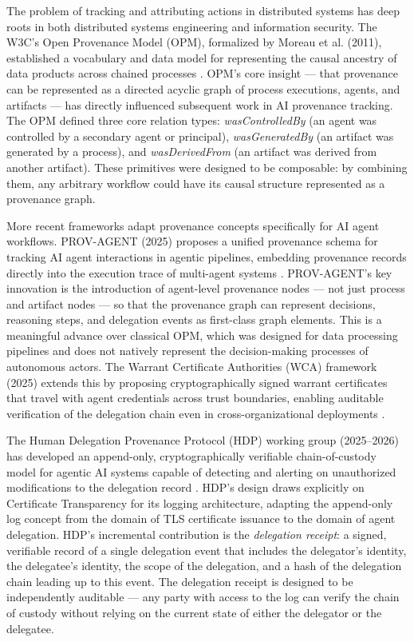 The problem of tracking and attributing actions in distributed systems has deep roots in both distributed systems engineering and information security. The W3C's Open Provenance Model (OPM), formalized by Moreau et al. (2011), established a vocabulary and data model for representing the causal ancestry of data products across chained processes \cite{moreau2015-prov}. OPM's core insight — that provenance can be represented as a directed acyclic graph of process executions, agents, and artifacts — has directly influenced subsequent work in AI provenance tracking. The OPM defined three core relation types: \textit{wasControlledBy} (an agent was controlled by a secondary agent or principal), \textit{wasGeneratedBy} (an artifact was generated by a process), and \textit{wasDerivedFrom} (an artifact was derived from another artifact). These primitives were designed to be composable: by combining them, any arbitrary workflow could have its causal structure represented as a provenance graph.

More recent frameworks adapt provenance concepts specifically for AI agent workflows. PROV-AGENT (2025) proposes a unified provenance schema for tracking AI agent interactions in agentic pipelines, embedding provenance records directly into the execution trace of multi-agent systems \cite{prov-agent2025}. PROV-AGENT's key innovation is the introduction of agent-level provenance nodes — not just process and artifact nodes — so that the provenance graph can represent decisions, reasoning steps, and delegation events as first-class graph elements. This is a meaningful advance over classical OPM, which was designed for data processing pipelines and does not natively represent the decision-making processes of autonomous actors. The Warrant Certificate Authorities (WCA) framework (2025) extends this by proposing cryptographically signed warrant certificates that travel with agent credentials across trust boundaries, enabling auditable verification of the delegation chain even in cross-organizational deployments \cite{wca2025}.

The Human Delegation Provenance Protocol (HDP) working group (2025–2026) has developed an append-only, cryptographically verifiable chain-of-custody model for agentic AI systems capable of detecting and alerting on unauthorized modifications to the delegation record \cite{hdp-draft,hdp-draft-2}. HDP's design draws explicitly on Certificate Transparency \cite{laurie2013certificate} for its logging architecture, adapting the append-only log concept from the domain of TLS certificate issuance to the domain of agent delegation. HDP's incremental contribution is the \textit{delegation receipt}: a signed, verifiable record of a single delegation event that includes the delegator's identity, the delegatee's identity, the scope of the delegation, and a hash of the delegation chain leading up to this event. The delegation receipt is designed to be independently auditable — any party with access to the log can verify the chain of custody without relying on the current state of either the delegator or the delegatee.

